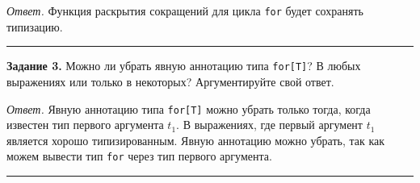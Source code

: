 \documentclass[landscape, 11pt]{report}
\begin{document}
	\vspace{0.5cm}

	\textit{Ответ.} Функция раскрытия сокращений для цикла \verb|for| будет сохранять типизацию.

	\vspace{0.5cm}
	\hrule
	\vspace{0.5cm}
	
	
	\textbf{Задание 3.} Можно ли убрать явную аннотацию типа \verb|for[T]|? В любых выражениях или только в некоторых? Аргументируйте свой ответ.
	
	\vspace{0.5cm}
	
	\textit{Ответ.} Явную аннотацию типа \verb|for[T]| можно убрать только тогда, когда известен тип первого аргумента $t_1$. В выражениях, где первый аргумент $t_1$ является хорошо типизированным. Явную аннотацию можно убрать, так как можем вывести тип \verb|for| через тип первого аргумента.
	
	\vspace{0.5cm}
	\hrule
	\vspace{0.5cm}
	
\end{document}
